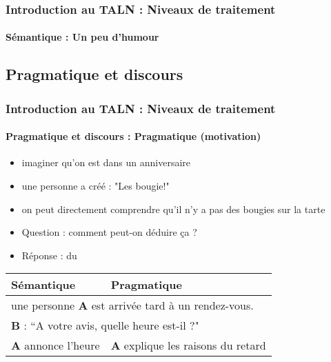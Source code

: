 \documentclass[xcolor=table]{beamer}
\begin{document}
\begin{frame}
\frametitle{Introduction au TALN : Niveaux de traitement}
\framesubtitle{Sémantique : Un peu d'humour}

\begin{center}
\end{center}

\end{frame}

\subsection{Pragmatique et discours}

\begin{frame}
\frametitle{Introduction au TALN : Niveaux de traitement}
\framesubtitle{Pragmatique et discours : Pragmatique (motivation)}

\begin{minipage}{0.7\textwidth}
\begin{itemize}
	\item imaginer qu'on est dans un anniversaire 
	\item une personne a créé : "Les bougie!"
	\item on peut directement comprendre qu'il n'y a pas des bougies sur la tarte
	\item Question : comment peut-on déduire ça ? 
	\item Réponse : du 
\end{itemize}
\end{minipage}
\begin{minipage}{0.28\textwidth}
\end{minipage}

\vfill
\begin{tabular}{|p{}|p{}|}
	\hline
	\bfseries Sémantique & \bfseries Pragmatique \\
	\hline 
	\multicolumn{2}{|l|}{une personne \textbf{A} est arrivée tard à un rendez-vous.} \\
	\multicolumn{2}{|l|}{\textbf{B} : ``A votre avis, quelle heure est-il ?"} \\
	\hline 
	\textbf{A} annonce l'heure &  \textbf{A} explique les raisons du retard \\
	\hline
\end{tabular}

\end{frame}
\end{document}
